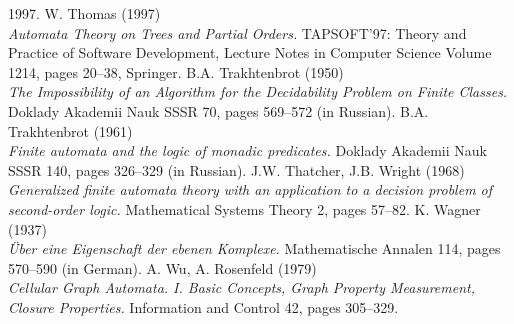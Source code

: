 \documentclass[a4paper,11pt,twoside]{report} \pdfoutput=1
\begin{document}
\begin{thebibliography}{9}
  1997.
  W. Thomas (1997) \\
  \emph{Automata Theory on Trees and Partial Orders.} TAPSOFT'97:
  Theory and Practice of Software Development, Lecture Notes in
  Computer Science Volume 1214, pages 20--38, Springer.
  B.A. Trakhtenbrot (1950) \\
  \emph{The Impossibility of an Algorithm for the Decidability Problem
    on Finite Classes.} Doklady Akademii Nauk SSSR 70, pages 569--572
  (in Russian).
  B.A. Trakhtenbrot (1961) \\
  \emph{Finite automata and the logic of monadic predicates.} Doklady
  Akademii Nauk SSSR 140, pages 326--329 (in Russian).
  J.W. Thatcher, J.B. Wright (1968) \\
  \emph{Generalized finite automata theory with an application to a
    decision problem of second-order logic.} Mathematical Systems
  Theory 2, pages 57--82.
  K. Wagner (1937) \\
  \emph{Über eine Eigenschaft der ebenen Komplexe.} Mathematische
  Annalen 114, pages 570--590 (in German).
  A. Wu, A. Rosenfeld (1979) \\
  \emph{Cellular Graph Automata. I. Basic Concepts, Graph Property
    Measurement, Closure Properties.} Information and Control 42,
  pages 305--329.
\end{thebibliography}
\end{document}
